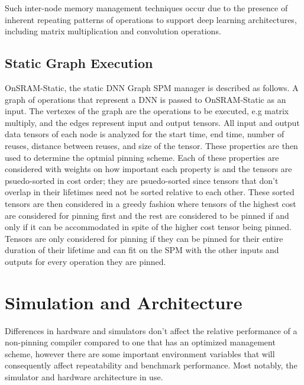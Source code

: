 Such inter-node memory management techniques occur due to the presence of
inherent repeating patterns of operations to support deep learning
architectures, including matrix multiplication and convolution operations.



\subsection{Static Graph Execution}

OnSRAM-Static, the static DNN Graph SPM manager is described as follows. A
graph of operations that represent a DNN is passed to OnSRAM-Static as an
input. The vertexes of the graph are the operations to be executed, e.g matrix
multiply, and the edges represent input and output tensors.  All input and
output data tensors of each node is analyzed for the start time, end time,
number of reuses, distance between reuses, and size of the tensor. These
properties are then used to determine the optmial pinning scheme. Each of these
properties are considered with weights on how important each property is and
the tensors are psuedo-sorted in cost order; they are psuedo-sorted since
tensors that don't overlap in their lifetimes need not be sorted relative to
each other. These sorted tensors are then considered in a greedy fashion where
tensors of the highest cost are considered for pinning first and the rest are
considered to be pinned if and only if it can be accommodated in spite of the
higher cost tensor being pinned. Tensors are only considered for pinning if
they can be pinned for their entire duration of their lifetime and can fit on
the SPM with the other inputs and outputs for every operation they are pinned.


\section{Simulation and Architecture}

Differences in hardware and simulators don't affect the relative performance of
a non-pinning compiler compared to one that has an optimized management scheme,
however there are some important environment variables that will consequently
affect repeatability and benchmark performance. Most notably, the simulator and
hardware architecture in use.

